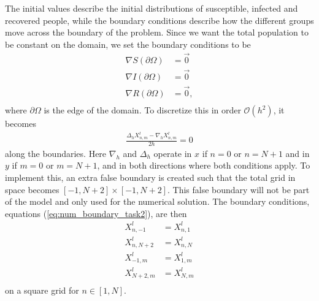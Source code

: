 The initial values describe the initial distributions of susceptible, infected and recovered people, while
the boundary conditions describe how the different groups move across the boundary of the problem. Since we want the total population to be constant on the domain, we set the boundary conditions to be
\begin{equation}
    \begin{split}
        \nabla S(\partial\Omega) &= \Vec{0} \\
        \nabla I(\partial\Omega) &= \Vec{0} \\
        \nabla R(\partial\Omega) &= \Vec{0}, \\
    \end{split}
\end{equation}
where $\partial\Omega$ is the edge of the domain. 
To discretize this in order $\mathcal{O}(h^2)$, it becomes
\begin{equation}
    \label{eq:num_boundary_task2}
    \begin{split}
        \frac{\Delta_h X_{n,m}^l - \nabla_h X_{n,m}^l}{2h} = 0
    \end{split}
\end{equation}
along the boundaries. Here $\nabla_h$ and $\Delta_h$ operate in $x$ if $n=0$ or $n=N+1$ and in $y$ if $m = 0$ or $m=N+1$, and in both directions where both conditions apply.
To implement this, an extra false boundary is created such that the total grid in space becomes $[-1, N+2] \times [-1, N+2]$. This false boundary will not be part of the model and only used for the numerical solution.
The boundary conditions, equations (\ref{eq:num_boundary_task2}), are then
\begin{equation}
    \begin{split}
        X_{n,-1}^l &= X_{n, 1}^l \\
        X_{n,N+2}^l &= X_{n, N}^l \\
        X_{-1,m}^l &= X_{1, m}^l \\
        X_{N+2,m}^l &= X_{N, m}^l \\
    \end{split}
\end{equation}
on a square grid for $n \in [1, N]$.

